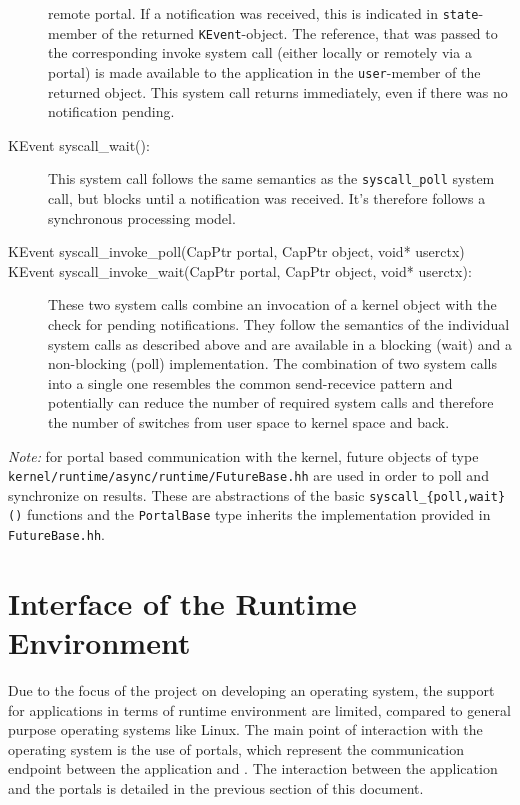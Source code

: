 \begin{description}
remote portal. If a notification was received, this is indicated in
\texttt{state}-member of the returned \texttt{KEvent}-object. The reference,
that was passed to the corresponding invoke system call (either locally or
remotely via a portal) is made available to the application in the
\texttt{user}-member of the returned object. This system call returns
immediately, even if there was no notification pending.
\item[KEvent syscall\_wait():] This system call follows the same semantics as
the \texttt{syscall\_poll} system call, but blocks until a notification was
received. It's therefore follows a synchronous processing model.
\item[KEvent syscall\_invoke\_poll(CapPtr portal, CapPtr object, void* userctx)]
\item[KEvent syscall\_invoke\_wait(CapPtr portal, CapPtr object, void*
userctx):] These two system calls combine an invocation of a kernel object with
the check for pending notifications. They follow the semantics of the individual
system calls as described above and are available in a blocking (wait) and a
non-blocking (poll) implementation. The combination of two system calls into a
single one resembles the common send-recevice pattern and potentially can reduce
the number of required system calls and therefore the number of switches from
user space to kernel space and back.
\end{description}

\noindent \emph{Note:} for portal based communication with the kernel, future
objects of type \texttt{kernel/runtime/async/runtime/FutureBase.hh} are used in
order to poll and synchronize on results. These are abstractions of the basic
\texttt{syscall\_\{poll,wait\}()} functions and the \texttt{PortalBase} type
inherits the implementation provided in \texttt{FutureBase.hh}.

\section{Interface of the \mythos Runtime Environment} Due to the focus of the
\mythos project on developing an operating system, the support for applications
in terms of runtime environment are limited, compared to general purpose
operating systems like Linux. The main point of interaction with the operating
system is the use of portals, which represent the communication endpoint between
the application and \mythos. The interaction between the application and the
portals is detailed in the previous section of this document.


